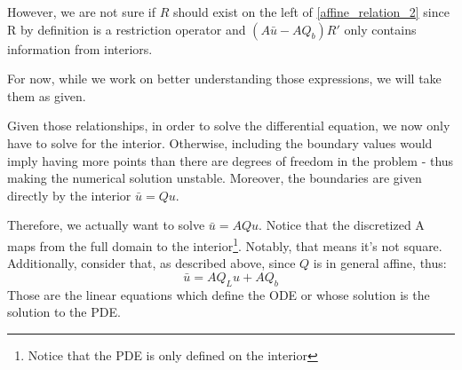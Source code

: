 \documentclass[11pt]{article}
\begin{document}
\begin{itemize}
			However, we are not sure if $R$ should exist on the left of \eqref{affine_relation_2} since R by definition is a restriction operator and $(A  \bar{u}-A  Q_b) R'$ only contains information from interiors.
			\iffalse %
			Also the size of the LHS of \eqref{affine_relation_2} is $K\times \bar{K}$, but the size of the RHS is $\bar{I}\times I$ .
			\fi
			For now, while we work on better understanding those expressions, we will take them as given.


			Given those relationships, in order to solve the differential equation, we now only have to solve for the interior. Otherwise, including the boundary values would imply having more points than there are degrees of freedom in the problem - thus making the numerical solution unstable. Moreover, the boundaries are given directly by the interior $\bar{u} = Q u$.

			Therefore, we actually want to solve $\bar{u} = A Q u$. Notice that the discretized A maps from the full domain to the interior\footnote{Notice that the PDE is only defined on the interior}. Notably, that means it's not square. Additionally, consider that, as described above, since $Q$ is in general affine, thus:
			\begin{equation}
			\bar{u} = A Q_L u + A Q_b
			\end{equation}
			Those are the linear equations which define the ODE or whose solution is the solution to the PDE.
		\end{itemize}
\end{document}
